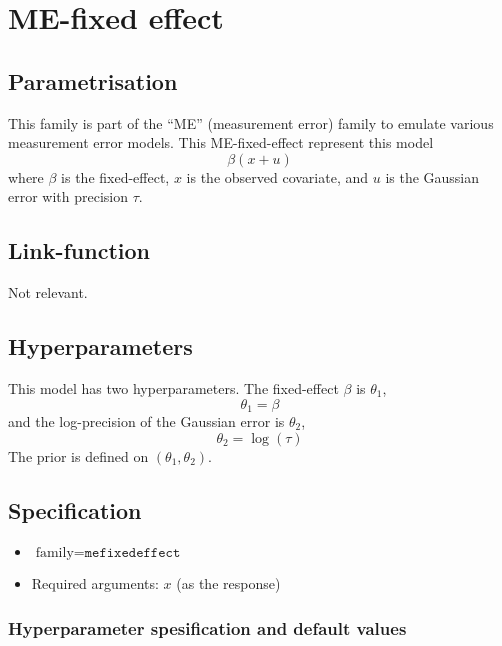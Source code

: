\documentclass[a4paper,11pt]{article}
\begin{document}
\section*{ME-fixed effect}

\subsection*{Parametrisation}

This family is part of the ``ME'' (measurement error) family to
emulate various measurement error models.
This ME-fixed-effect represent this model
\begin{displaymath}
    \beta(x + u)
\end{displaymath}
where $\beta$ is the fixed-effect, $x$ is the observed covariate, and
$u$ is the Gaussian error with precision $\tau$.

\subsection*{Link-function}

Not relevant.

\subsection*{Hyperparameters}

This model has two hyperparameters. 
The fixed-effect $\beta$ is $\theta_{1}$,
\begin{displaymath}
    \theta_{1} = \beta
\end{displaymath}
and the log-precision of the Gaussian error is $\theta_{2}$,
\begin{displaymath}
    \theta_{2} = \log(\tau)
\end{displaymath}
The prior is defined on $(\theta_{1},\theta_{2})$.

\subsection*{Specification}

\begin{itemize}
\item $\text{family}=\texttt{mefixedeffect}$
\item Required arguments: $x$ (as the response)
\end{itemize}
\subsubsection*{Hyperparameter spesification and default values}

\end{document}
